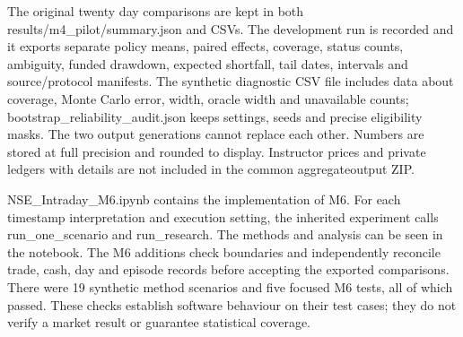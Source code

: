 \documentclass[11pt,a4paper]{article}
\begin{document}
The original twenty day comparisons are kept in both results/m4\_pilot/summary.json and CSVs. The development run is recorded and it exports separate policy means, paired effects, coverage, status counts, ambiguity, funded drawdown, expected shortfall, tail dates, intervals and source/protocol manifests. The synthetic diagnostic CSV file includes data about coverage, Monte Carlo error, width, oracle width and unavailable counts; bootstrap\_reliability\_audit.json keeps settings, seeds and precise eligibility masks. The two output generations cannot replace each other. Numbers are stored at full precision and rounded to display. Instructor prices and private ledgers with details are not included in the common aggregate\allowbreak{}output ZIP.

NSE\_Intraday\_M6.ipynb contains the implementation of M6. For each timestamp interpretation and execution setting, the inherited experiment calls run\_one\_scenario and run\_research. The methods and analysis can be seen in the notebook. The M6 additions check boundaries and independently reconcile trade, cash, day and episode records before accepting the exported comparisons. There were 19 synthetic method scenarios and five focused M6 tests, all of which passed. These checks establish software behaviour on their test cases; they do not verify a market result or guarantee statistical coverage.
\end{document}
